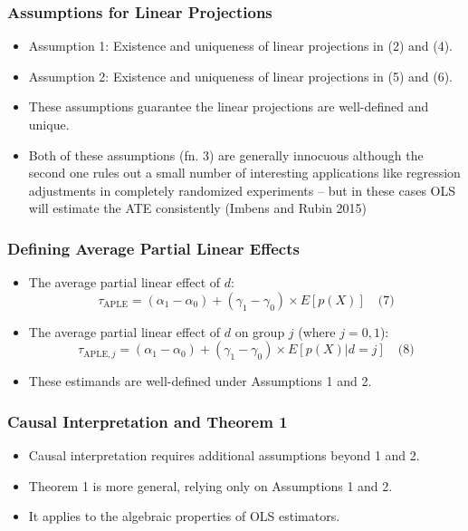 \documentclass{beamer}
\begin{document}
\begin{frame}
\frametitle{Assumptions for Linear Projections}
\begin{itemize}
    \item Assumption 1: Existence and uniqueness of linear projections in (2) and (4).
    \item Assumption 2: Existence and uniqueness of linear projections in (5) and (6).
    \item These assumptions guarantee the linear projections are well-defined and unique.
    \item Both of these assumptions (fn. 3) are generally innocuous although the second one rules out a small number of interesting applications like regression adjustments in completely randomized experiments -- but in these cases OLS will estimate the ATE consistently (Imbens and Rubin 2015)
\end{itemize}
\end{frame}

\begin{frame}
\frametitle{Defining Average Partial Linear Effects}
\begin{itemize}
    \item The average partial linear effect of \( d \):
    \[ \tau_{\text{APLE}} = (\alpha_1 - \alpha_0) + (\gamma_1 - \gamma_0) \times E[p(X)] \quad \text{(7)} \]
    \item The average partial linear effect of \( d \) on group \( j \) (where \( j = 0, 1 \)):
    \[ \tau_{\text{APLE}, j} = (\alpha_1 - \alpha_0) + (\gamma_1 - \gamma_0) \times E[p(X) | d = j] \quad \text{(8)} \]
    \item These estimands are well-defined under Assumptions 1 and 2.
\end{itemize}
\end{frame}

\begin{frame}
\frametitle{Causal Interpretation and Theorem 1}
\begin{itemize}
    \item Causal interpretation requires additional assumptions beyond 1 and 2.
    \item Theorem 1 is more general, relying only on Assumptions 1 and 2.
    \item It applies to the algebraic properties of OLS estimators.
\end{itemize}
\end{frame}
\end{document}
